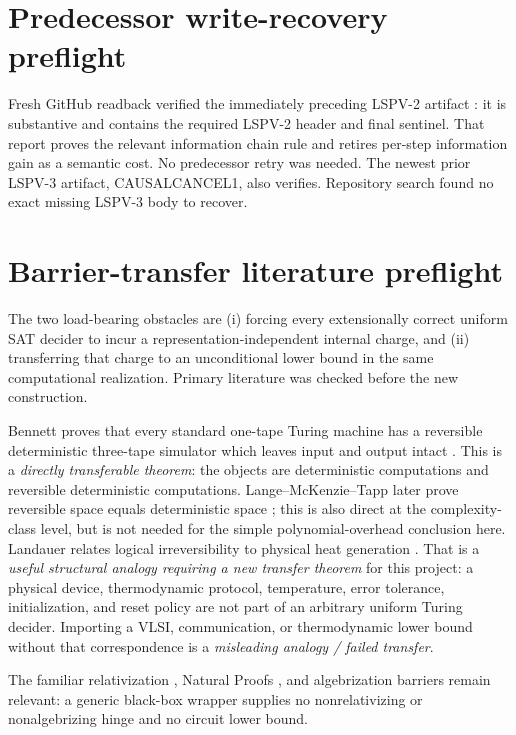 \documentclass[11pt]{article}
\begin{document}
\section{Predecessor write-recovery preflight}
Fresh GitHub readback verified the immediately preceding LSPV-2 artifact
:
it is substantive and contains the required LSPV-2 header and final sentinel.
That report proves the relevant information chain rule and retires per-step
information gain as a semantic cost.  No predecessor retry was needed.  The
newest prior LSPV-3 artifact, CAUSALCANCEL1, also verifies.  Repository search
found no exact missing LSPV-3 body to recover.

\section{Barrier-transfer literature preflight}
The two load-bearing obstacles are (i) forcing every extensionally correct
uniform SAT decider to incur a representation-independent internal charge,
and (ii) transferring that charge to an unconditional lower bound in the
same computational realization.  Primary literature was checked before the
new construction.

Bennett proves that every standard one-tape Turing machine has a reversible
deterministic three-tape simulator which leaves input and output intact
\cite{Bennett1973}.  This is a \emph{directly transferable theorem}: the
objects are deterministic computations and reversible deterministic
computations.  Lange--McKenzie--Tapp later prove reversible space equals
deterministic space \cite{LMT2000}; this is also direct at the complexity-class
level, but is not needed for the simple polynomial-overhead conclusion here.
Landauer relates logical irreversibility to physical heat generation
\cite{Landauer1961}.  That is a \emph{useful structural analogy requiring a
new transfer theorem} for this project: a physical device, thermodynamic
protocol, temperature, error tolerance, initialization, and reset policy are
not part of an arbitrary uniform Turing decider.  Importing a VLSI,
communication, or thermodynamic lower bound without that correspondence is a
\emph{misleading analogy / failed transfer}.

The familiar relativization \cite{BGS1975}, Natural Proofs \cite{RR1997}, and
algebrization \cite{AW2009} barriers remain relevant: a generic black-box
wrapper supplies no nonrelativizing or nonalgebrizing hinge and no circuit
lower bound.
\end{document}
